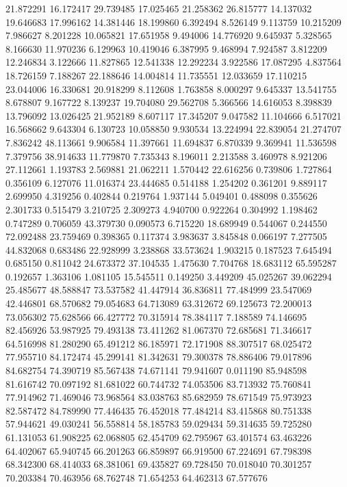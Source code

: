 21.872291
16.172417
29.739485
17.025465
21.258362
26.815777
14.137032
19.646683
17.996162
14.381446
18.199860
6.392494
8.526149
9.113759
10.215209
7.986627
8.201228
10.065821
17.651958
9.494006
14.776920
9.645937
5.328565
8.166630
11.970236
6.129963
10.419046
6.387995
9.468994
7.924587
3.812209
12.246834
3.122666
11.827865
12.541338
12.292234
3.922586
17.087295
4.837564
18.726159
7.188267
22.188646
14.004814
11.735551
12.033659
17.110215
23.044006
16.330681
20.918299
8.112608
1.763858
8.000297
9.645337
13.541755
8.678807
9.167722
8.139237
19.704080
29.562708
5.366566
14.616053
8.398839
13.796092
13.026425
21.952189
8.607117
17.345207
9.047582
11.104666
6.517021
16.568662
9.643304
6.130723
10.058850
9.930534
13.224994
22.839054
21.274707
7.836242
48.113661
9.906584
11.397661
11.694837
6.870339
9.369941
11.536598
7.379756
38.914633
11.779870
7.735343
8.196011
2.213588
3.460978
8.921206
27.112661
1.193783
2.569881
21.062211
1.570442
22.616256
0.739806
1.727864
0.356109
6.127076
11.016374
23.444685
0.514188
1.254202
0.361201
9.889117
2.699950
4.319256
0.402844
0.219764
1.937144
5.049401
0.488098
0.355626
2.301733
0.515479
3.210725
2.309273
4.940700
0.922264
0.304992
1.198462
0.747289
0.706059
43.379730
0.090573
6.715220
18.689949
0.544067
0.244550
72.092488
23.759469
0.398365
0.117374
3.983637
3.845848
0.066197
7.277505
44.832068
0.683486
22.928999
3.238868
33.573624
1.903215
0.187523
7.645494
0.685150
0.811042
24.673372
37.104535
1.475630
7.704768
18.683112
65.595287
0.192657
1.363106
1.081105
15.545511
0.149250
3.449209
45.025267
39.062294
25.485677
48.588847
73.537582
41.447914
36.836811
77.484999
23.547069
42.446801
68.570682
79.054683
64.713089
63.312672
69.125673
72.200013
73.056302
75.628566
66.427772
70.315914
78.384117
7.188589
74.146695
82.456926
53.987925
79.493138
73.411262
81.067370
72.685681
71.346617
64.516998
81.280290
65.491212
86.185971
72.171908
88.307517
68.025472
77.955710
84.172474
45.299141
81.342631
79.300378
78.886406
79.017896
84.682754
74.390719
85.567438
74.671141
79.941607
0.011190
85.948598
81.616742
70.097192
81.681022
60.744732
74.053506
83.713932
75.760841
77.914962
71.469046
73.968564
83.038763
85.682959
78.671549
75.973923
82.587472
84.789990
77.446435
76.452018
77.484214
83.415868
80.751338
57.944621
49.030241
56.558814
58.185783
59.029434
59.314635
59.725280
61.131053
61.908225
62.068805
62.454709
62.795967
63.401574
63.463226
64.402067
65.940745
66.201263
66.859897
66.919500
67.224691
67.798398
68.342300
68.414033
68.381061
69.435827
69.728450
70.018040
70.301257
70.203384
70.463956
68.762748
71.654253
64.462313
67.577676
